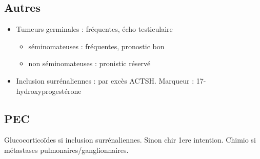 \documentclass[11pt]{article}
\begin{document}
\subsection{Autres}
\label{sec:org3d24277}
\begin{itemize}
\item Tumeurs germinales : fréquentes, écho testiculaire
\begin{itemize}
\item séminomateuses : fréquentes, pronostic bon
\item non séminomateuses : pronistic réservé
\end{itemize}
\item Inclusion surrénaliennes : par excès ACTSH. Marqueur : 17-hydroxyprogestérone
\end{itemize}

\subsection{PEC}
\label{sec:orgea2a4be}
Glucocorticoïdes si inclusion surrénaliennes. Sinon chir 1ere intention. Chimio si métastases pulmonaires/ganglionnaires.


\printglossaries
\end{document}
